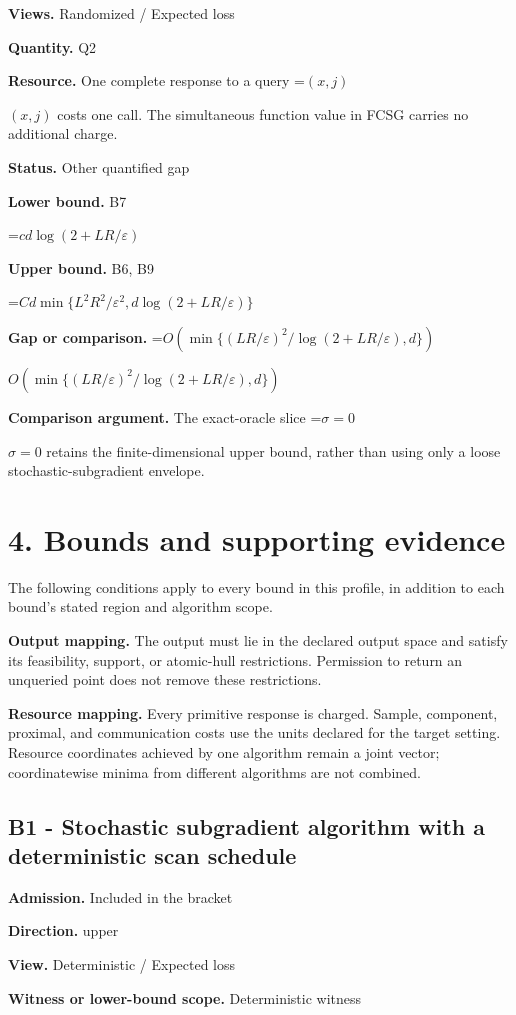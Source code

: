 \documentclass[10pt,a4paper]{article}
\newcommand{\AtlasMath}[1]{\par\begingroup\centering\setbox0=\hbox{$\displaystyle #1$}\ifdim\wd0>1.4\linewidth\typeout{ATLAS WIDE FORMULA: \the\wd0}\fi\ifdim\wd0>\linewidth\resizebox{\linewidth}{!}{\box0}\else\box0\fi\par\endgroup}
\newcommand{\AtlasInlineMath}[1]{\begingroup\setbox0=\hbox{$#1$}\ifdim\wd0>.4\linewidth\endgroup\AtlasMath{#1}\else\endgroup$#1$\fi}
\begin{document}
\textbf{Views.} Randomized / Expected loss

\textbf{Quantity.} Q2

\textbf{Resource.} One complete response to a query \AtlasInlineMath{(x,j)} costs one call. The simultaneous function value in FCSG carries no additional charge.

\textbf{Status.} Other quantified gap

\textbf{Lower bound.} B7

\AtlasMath{cd\log(2+LR/\varepsilon)}
\textbf{Upper bound.} B6, B9

\AtlasMath{Cd\min\{L^2R^2/\varepsilon^2,d\log(2+LR/\varepsilon)\}}
\textbf{Gap or comparison.} \AtlasInlineMath{O\!\left(\min\{(LR/\varepsilon)^2/\log(2+LR/\varepsilon),d\}\right)}

\textbf{Comparison argument.} The exact-oracle slice \AtlasInlineMath{\sigma=0} retains the finite-dimensional upper bound, rather than using only a loose stochastic-subgradient envelope.

\section{4. Bounds and supporting evidence}
The following conditions apply to every bound in this profile, in addition to each bound's stated region and algorithm scope.

\textbf{Output mapping.} The output must lie in the declared output space and satisfy its feasibility, support, or atomic-hull restrictions. Permission to return an unqueried point does not remove these restrictions.

\textbf{Resource mapping.} Every primitive response is charged. Sample, component, proximal, and communication costs use the units declared for the target setting. Resource coordinates achieved by one algorithm remain a joint vector; coordinatewise minima from different algorithms are not combined.

\subsection{B1 - Stochastic subgradient algorithm with a deterministic scan schedule}
\textbf{Admission.} Included in the bracket

\textbf{Direction.} upper

\textbf{View.} Deterministic / Expected loss

\textbf{Witness or lower-bound scope.} Deterministic witness
\end{document}
